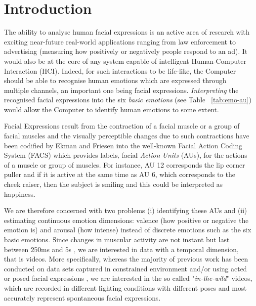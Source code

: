 \documentclass[12pt,twoside]{article}
\begin{document}


\tableofcontents
\clearpage

\section{Introduction}

The ability to analyse human facial expressions is an active area of research with exciting near-future real-world applications ranging from law enforcement to advertising (measuring how positively or negatively people respond to an ad). It would also be at the core of any system capable of intelligent Human-Computer Interaction (HCI). Indeed, for such interactions to be life-like, the Computer should be able to recognise human emotions which are expressed through multiple channels, an important one being facial expressions. \textit{Interpreting} the recognised facial expressions into the six \textit{basic emotions} \cite{RefWorks:12} (see Table ~\ref{tab:emo-au}) would allow the Computer to identify human emotions to some extent.

Facial Expressions result from the contraction of a facial muscle or a group of facial muscles and the visually perceptible changes due to such contractions have been codified by Ekman and Friesen into the well-known Facial Action Coding System (FACS) \cite{RefWorks:10} which provides labels, facial \textit{Action Units} (AUs), for the actions of a muscle or group of muscles. For instance, AU 12 corresponds the lip corner puller and if it is active at the same time as AU 6, which corresponds to the cheek raiser, then the subject is smiling and this could be interpreted as happiness.

We are therefore concerned with two problems (i) identifying these AUs and (ii) estimating continuous emotion dimensions: valence (how positive or negative the emotion is) and arousal (how intense) instead of discrete emotions such as the six basic emotions. Since changes in muscular activity are not instant but last between 250ms and 5s \cite{RefWorks:11}, we are interested in data with a temporal dimension, that is videos. More specifically, whereas the majority of previous work has been conducted on data sets captured in constrained environment and/or using acted or posed facial expressions \cite{RefWorks:2}, we are interested in the so called "\textit{in-the-wild}" videos, which are recorded in different lighting conditions with different poses and most accurately represent spontaneous facial expressions.
\end{document}
